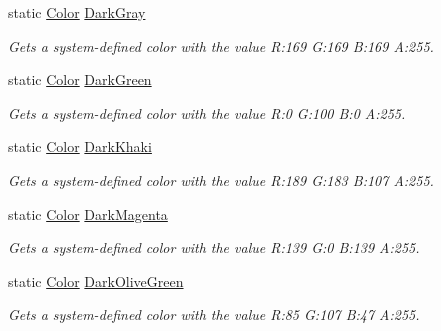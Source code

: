 \begin{DoxyCompactItemize}
static \hyperlink{struct_microsoft_1_1_xna_1_1_framework_1_1_color}{Color} \hyperlink{struct_microsoft_1_1_xna_1_1_framework_1_1_color_a2c0971ddeac72175cb09dac0b019f2a1}{Dark\+Gray}
\begin{DoxyCompactList}\small\item\em Gets a system-\/defined color with the value R\+:169 G\+:169 B\+:169 A\+:255.\end{DoxyCompactList}\item 
static \hyperlink{struct_microsoft_1_1_xna_1_1_framework_1_1_color}{Color} \hyperlink{struct_microsoft_1_1_xna_1_1_framework_1_1_color_a0e718bf6fe87a6171cf7948d280db774}{Dark\+Green}
\begin{DoxyCompactList}\small\item\em Gets a system-\/defined color with the value R\+:0 G\+:100 B\+:0 A\+:255.\end{DoxyCompactList}\item 
static \hyperlink{struct_microsoft_1_1_xna_1_1_framework_1_1_color}{Color} \hyperlink{struct_microsoft_1_1_xna_1_1_framework_1_1_color_a6ab7caf490efb002ce06b7b8fca6fb46}{Dark\+Khaki}
\begin{DoxyCompactList}\small\item\em Gets a system-\/defined color with the value R\+:189 G\+:183 B\+:107 A\+:255.\end{DoxyCompactList}\item 
static \hyperlink{struct_microsoft_1_1_xna_1_1_framework_1_1_color}{Color} \hyperlink{struct_microsoft_1_1_xna_1_1_framework_1_1_color_a7a0b25960bd30043b9ef1b7848242f6d}{Dark\+Magenta}
\begin{DoxyCompactList}\small\item\em Gets a system-\/defined color with the value R\+:139 G\+:0 B\+:139 A\+:255.\end{DoxyCompactList}\item 
static \hyperlink{struct_microsoft_1_1_xna_1_1_framework_1_1_color}{Color} \hyperlink{struct_microsoft_1_1_xna_1_1_framework_1_1_color_a37133654fc35923f2bc2a08b7c8d555b}{Dark\+Olive\+Green}
\begin{DoxyCompactList}\small\item\em Gets a system-\/defined color with the value R\+:85 G\+:107 B\+:47 A\+:255.\end{DoxyCompactList}\item 

\end{DoxyCompactItemize}

